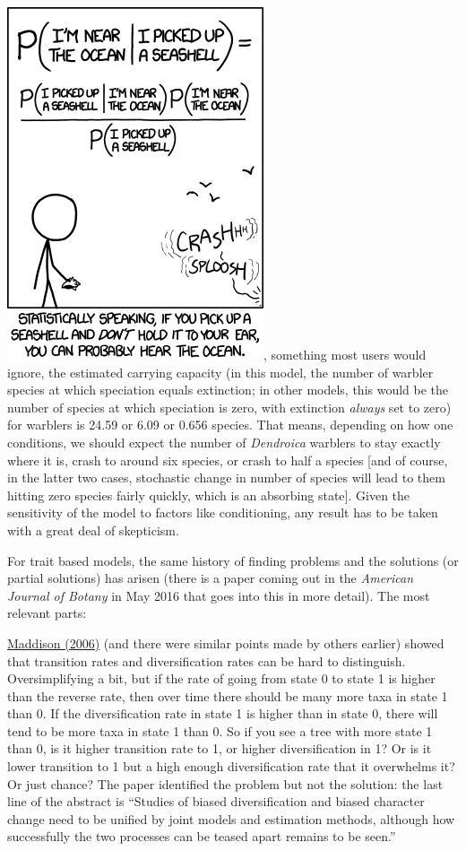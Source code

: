 \documentclass[]{article}
\begin{document}
{  \includegraphics{images/seashell.png}}, something most users would ignore, the estimated carrying capacity (in this model, the number of warbler species at which speciation equals extinction; in other models, this would be the number of species at which speciation is zero, with extinction \emph{always} set to zero) for warblers is 24.59 or 6.09 or 0.656 species. That means, depending on how one conditions, we should expect the number of \emph{Dendroica} warblers to stay exactly where it is, crash to around six species, or crash to half a species {[}and of course, in the latter two cases, stochastic change in number of species will lead to them hitting zero species fairly quickly, which is an absorbing state{]}. Given the sensitivity of the model to factors like conditioning, any result has to be taken with a great deal of skepticism.

For trait based models, the same history of finding problems and the solutions (or partial solutions) has arisen (there is a paper coming out in the \emph{American Journal of Botany} in May 2016 that goes into this in more detail). The most relevant parts:

\href{http://onlinelibrary.wiley.com/doi/10.1111/j.0014-3820.2006.tb00517.x/abstract}{Maddison (2006)} (and there were similar points made by others earlier) showed that transition rates and diversification rates can be hard to distinguish. Oversimplifying a bit, but if the rate of going from state 0 to state 1 is higher than the reverse rate, then over time there should be many more taxa in state 1 than 0. If the diversification rate in state 1 is higher than in state 0, there will tend to be more taxa in state 1 than 0. So if you see a tree with more state 1 than 0, is it higher transition rate to 1, or higher diversification in 1? Or is it lower transition to 1 but a high enough diversification rate that it overwhelms it? Or just chance? The paper identified the problem but not the solution: the last line of the abstract is ``Studies of biased diversification and biased character change need to be unified by joint models and estimation methods, although how successfully the two processes can be teased apart remains to be seen.''
\end{document}
